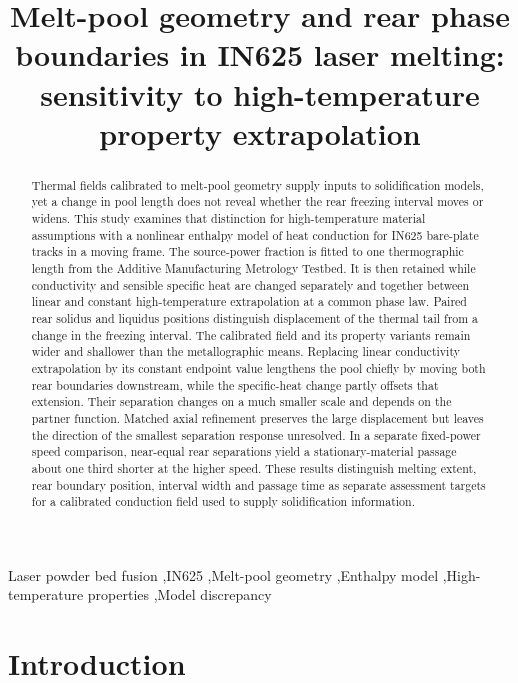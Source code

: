 \documentclass[preprint,12pt]{elsarticle}
\begin{document}
\begin{frontmatter}
\title{Melt-pool geometry and rear phase boundaries in IN625 laser melting: sensitivity to high-temperature property extrapolation}

\begin{abstract}
Thermal fields calibrated to melt-pool geometry supply inputs to solidification models, yet a change in pool length does not reveal whether the rear freezing interval moves or widens. This study examines that distinction for high-temperature material assumptions with a nonlinear enthalpy model of heat conduction for IN625 bare-plate tracks in a moving frame. The source-power fraction is fitted to one thermographic length from the Additive Manufacturing Metrology Testbed. It is then retained while conductivity and sensible specific heat are changed separately and together between linear and constant high-temperature extrapolation at a common phase law. Paired rear solidus and liquidus positions distinguish displacement of the thermal tail from a change in the freezing interval. The calibrated field and its property variants remain wider and shallower than the metallographic means. Replacing linear conductivity extrapolation by its constant endpoint value lengthens the pool chiefly by moving both rear boundaries downstream, while the specific-heat change partly offsets that extension. Their separation changes on a much smaller scale and depends on the partner function. Matched axial refinement preserves the large displacement but leaves the direction of the smallest separation response unresolved. In a separate fixed-power speed comparison, near-equal rear separations yield a stationary-material passage about one third shorter at the higher speed. These results distinguish melting extent, rear boundary position, interval width and passage time as separate assessment targets for a calibrated conduction field used to supply solidification information.
\end{abstract}
\begin{keyword}
Laser powder bed fusion \sep IN625 \sep Melt-pool geometry \sep Enthalpy model \sep High-temperature properties \sep Model discrepancy
\end{keyword}
\end{frontmatter}

\section{Introduction}
\label{sec:introduction}
\end{document}
